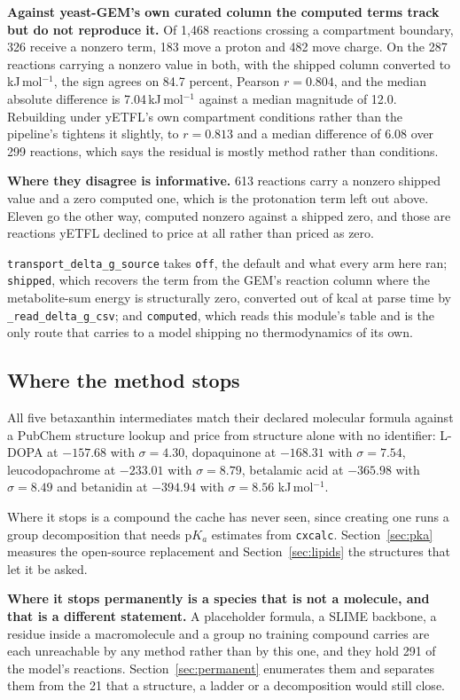 \textbf{Against yeast-GEM's own curated column the computed terms track but do not
reproduce it.} Of 1{,}468 reactions crossing a compartment boundary, 326 receive a nonzero
term, 183 move a proton and 482 move charge. On the 287 reactions carrying a nonzero value
in both, with the shipped column converted to kJ\,mol$^{-1}$, the sign agrees on 84.7
percent, Pearson $r = 0.804$, and the median absolute difference is 7.04\,kJ\,mol$^{-1}$
against a median magnitude of 12.0. Rebuilding under yETFL's own compartment conditions
rather than the pipeline's tightens it slightly, to $r = 0.813$ and a median difference of
6.08 over 299 reactions, which says the residual is mostly method rather than conditions.

\textbf{Where they disagree is informative.} 613 reactions carry a nonzero shipped value and
a zero computed one, which is the protonation term left out above. Eleven
go the other way, computed nonzero against a shipped zero, and those are reactions yETFL
declined to price at all rather than priced as zero.

\texttt{transport\_delta\_g\_source} takes \texttt{off}, the default and what every arm here
ran; \texttt{shipped}, which recovers the term from the GEM's reaction column where the
metabolite-sum energy is structurally zero, converted out of kcal at parse time by
\texttt{\_read\_delta\_g\_csv}; and \texttt{computed}, which reads this module's table and is
the only route that carries to a model shipping no thermodynamics of its own.

\subsection{Where the method stops}

All five betaxanthin intermediates match their declared molecular formula
against a PubChem structure lookup and price from structure alone with no identifier:
L-DOPA at $-157.68$ with $\sigma = 4.30$, dopaquinone at $-168.31$ with $\sigma = 7.54$,
leucodopachrome at $-233.01$ with $\sigma = 8.79$, betalamic acid at $-365.98$ with
$\sigma = 8.49$ and betanidin at $-394.94$ with $\sigma = 8.56$ kJ\,mol$^{-1}$.

Where it stops is a compound the cache has never seen, since creating one runs a group
decomposition that needs p$K_a$ estimates from \texttt{cxcalc}.
Section~\ref{sec:pka} measures the open-source replacement and
Section~\ref{sec:lipids} the structures that let it be asked.

\textbf{Where it stops permanently is a species that is not a molecule, and that is a
different statement.} A placeholder formula, a SLIME backbone, a residue inside a
macromolecule and a group no training compound carries are each unreachable by any method
rather than by this one, and they hold 291 of the model's reactions.
Section~\ref{sec:permanent} enumerates them and separates them from the 21 that a
structure, a ladder or a decomposition would still close.
